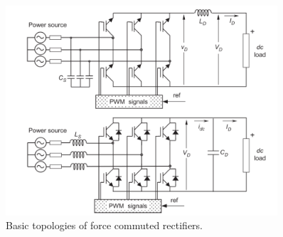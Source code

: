 \begin{figure}[!ht]
        \centering
        \includegraphics[width=0.9\textwidth]{EMPC_PNG_Pics/CurrentVoltageRectifiers.png}
        \caption{Basic topologies of force commuted rectifiers.}
        \label{BASICCSR:fig:topologies}
    \end{figure}


